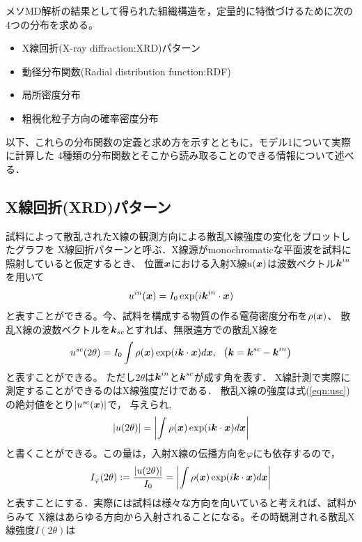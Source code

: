 ﻿メソMD解析の結果として得られた組織構造を，定量的に特徴づけるために次の4つの分布を求める。
\begin{itemize}
	\item X線回折(X-ray diffraction:XRD)パターン
	\item 動径分布関数(Radial distribution function:RDF)
	\item 局所密度分布
	\item 粗視化粒子方向の確率密度分布
\end{itemize}
以下、これらの分布関数の定義と求め方を示すとともに，モデル1について実際に計算した
4種類の分布関数とそこから読み取ることのできる情報について述べる．
\subsection{X線回折(XRD)パターン}
試料によって散乱されたX線の観測方向による散乱X線強度の変化をプロットしたグラフを
X線回折パターンと呼ぶ．X線源がmonochromaticな平面波を試料に照射していると仮定するとき、
位置$\mbox{\boldmath $x$}$における入射X線$u(\mbox{\boldmath $x$})$は波数ベクトル$\mbox{\boldmath $k$}^{in}$を用いて
\begin{equation}
	u^{in}(\mbox{\boldmath $x$})=I_0 \exp(i\mbox{\boldmath $k$}^{in}\cdot\mbox{\boldmath $x$})
	\label{eqn:uin}
\end{equation}
と表すことができる。今、試料を構成する物質の作る電荷密度分布を$\rho(\mbox{\boldmath $x$})$、
散乱X線の波数ベクトルを$\mbox{\boldmath $k$}_{sc}$とすれば、無限遠方での散乱X線を
\begin{equation}
	u^{sc}(2\theta)=I_0 \int \rho(\fat{x})\exp(i\fat{k}\cdot\fat{x})d\fat{x}, \ \ 
	\left(\fat{k}=\fat{k}^{sc}-\fat{k}^{in}\right)
	\label{eqn:usc}
\end{equation}
と表すことができる。
ただし$2\theta$は$\mbox{\boldmath $k$}^{in}$と$\mbox{\boldmath $k$}^{sc}$が成す角を表す．
X線計測で実際に測定することができるのはX線強度だけである．
散乱X線の強度は式(\ref{eqn:usc})の絶対値をとり$\left| u^{sc}(\mbox{\boldmath $x$})\right|$で，
与えられ,
\begin{equation}
	\left|u(2\theta)\right|
	=
	\left|\int \rho(\mbox{\boldmath $x$}) \exp(i\mbox{\boldmath $k$}\cdot \mbox{\boldmath $x$}) d\mbox{\boldmath $x$} \right|
	\label{eqn:I2th_bar}
\end{equation}
と書くことができる。この量は，入射X線の伝播方向を$\varphi$にも依存するので，
\begin{equation}
	I_\varphi(2\theta):
		=\frac{\left|u(2\theta)\right|}{I_0}
		=
	\left|\int \rho(\mbox{\boldmath $x$}) \exp(i\mbox{\boldmath $k$}\cdot \mbox{\boldmath $x$}) d\mbox{\boldmath $x$} \right|
	\label{eqn:Iphi}
\end{equation}
と表すことにする．実際には試料は様々な方向を向いていると考えれば、試料からみて
X線はあらゆる方向から入射されることになる。その時観測される散乱X線強度$I(2\theta)$は

